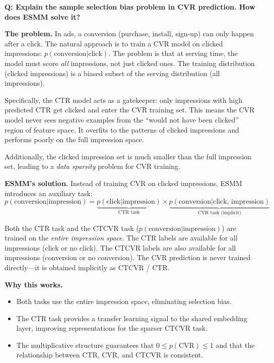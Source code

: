 \begin{interviewq}
\textbf{Q: Explain the sample selection bias problem in CVR prediction. How does ESMM solve it?}

 \quad {} \quad \badgefreq{\freqmed}

\stronganswer

\textbf{The problem.} In ads, a conversion (purchase, install, sign-up) can only happen after a click. The natural approach is to train a CVR model on clicked impressions: $p(\text{conversion} | \text{click})$. The problem is that at serving time, the model must score \textit{all} impressions, not just clicked ones. The training distribution (clicked impressions) is a biased subset of the serving distribution (all impressions).

Specifically, the CTR model acts as a gatekeeper: only impressions with high predicted CTR get clicked and enter the CVR training set. This means the CVR model never sees negative examples from the ``would not have been clicked'' region of feature space. It overfits to the patterns of clicked impressions and performs poorly on the full impression space.

Additionally, the clicked impression set is much smaller than the full impression set, leading to a \textit{data sparsity} problem for CVR training.

\textbf{ESMM's solution.} Instead of training CVR on clicked impressions, ESMM introduces an auxiliary task:
\begin{equation}
p(\text{conversion} | \text{impression}) = \underbrace{p(\text{click} | \text{impression})}_{\text{CTR task}} \times \underbrace{p(\text{conversion} | \text{click, impression})}_{\text{CVR task (implicit)}}
\end{equation}

Both the CTR task and the CTCVR task ($p(\text{conversion} | \text{impression})$) are trained on the \textit{entire impression space}. The CTR labels are available for all impressions (click or no click). The CTCVR labels are also available for all impressions (conversion or no conversion). The CVR prediction is never trained directly---it is obtained implicitly as CTCVR / CTR.

\textbf{Why this works.}
\begin{itemize}
    \item Both tasks use the entire impression space, eliminating selection bias.
    \item The CTR task provides a transfer learning signal to the shared embedding layer, improving representations for the sparser CTCVR task.
    \item The multiplicative structure guarantees that $0 \leq p(\text{CVR}) \leq 1$ and that the relationship between CTR, CVR, and CTCVR is consistent.
\end{itemize}


\end{interviewq}
